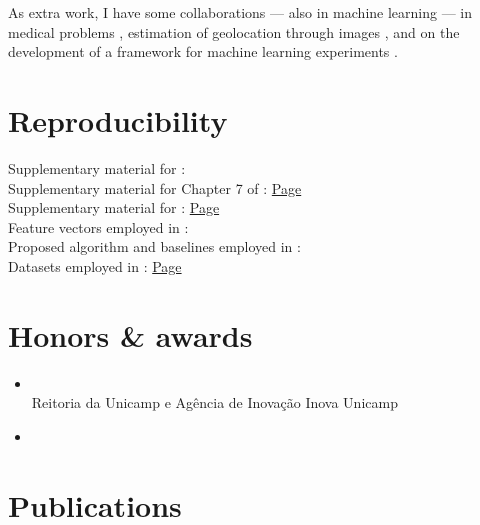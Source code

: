 As extra work, I have some collaborations --- also in machine learning --- in medical problems , estimation of geolocation through images , and on the development of a framework for machine learning experiments .

\section*{Reproducibility}
\label{sec:reproducibility}

Supplementary material for : 
\\
Supplementary material for Chapter 7 of : \href{OSNNet.html}{Page}
\\
Supplementary material for : \href{oscmi.html}{Page}
\\
Feature vectors employed in : 
\\
Proposed algorithm and baselines employed in : 
\\
Datasets employed in : \href{dataset-VLPL.html}{Page}

\section*{Honors \& awards}

\begin{flushleft}
  \begin{itemize}
    \item{} \\Reitoria da Unicamp e Agência de Inovação Inova Unicamp
    \item{}\\
  \end{itemize}
\end{flushleft}

\section*{Publications}

